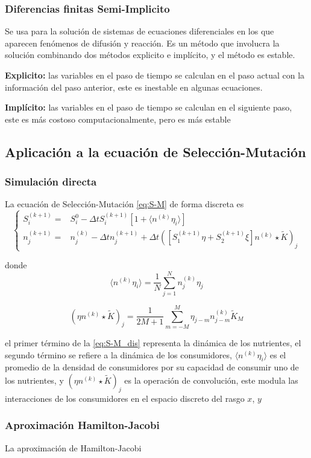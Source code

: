 \subsubsection{Diferencias finitas Semi-Implicito}

Se usa para la solución de sistemas de ecuaciones diferenciales en los que aparecen fenómenos de difusión y reacción. Es un método que involucra la solución combinando dos métodos explicito e implícito, y el método es estable.

\textbf{Explicito:} las variables en el paso de tiempo se calculan en el paso actual con la información del paso anterior, este es inestable en algunas ecuaciones.

\textbf{Implícito:} las variables en el paso de tiempo se calculan en el siguiente paso, este es más costoso computacionalmente, pero es más estable

\subsection{Aplicación a la ecuación de Selección-Mutación}
\subsubsection{Simulación directa}

La ecuación de Selección-Mutación \eqref{eq:S-M} de forma discreta es
\begin{equation}
	\left\{\begin{matrix}
		S_{i}^{(k+1)} = & S_{i}^{0}-\Delta tS_{i}^{(k+1)}[1+\langle{n^{(k)}\eta_{i}}\rangle  ]                                        \\
		n_{j}^{(k+1)} = & n_{j}^{(k)}-\Delta t n_{j}^{(k+1)}+\Delta t([S_{1}^{(k+1)}\eta+S_{2}^{(k+1)}\xi]n^{(k)}\star \tilde{K})_{j}
	\end{matrix}\right.
	\label{eq:S-M_dis}
\end{equation}

donde
\begin{equation*}
	\langle{n^{(k)}\eta_{i}}\rangle = \frac{1}{N}\sum_{j=1}^{N}n_{j}^{(k)}\eta_{j}
\end{equation*}

\begin{equation*}
	(\eta n^{(k)}\star \tilde{K})_{j}=\frac{1}{2M+1}\sum_{m=-M}^{M}\eta_{j-m}n_{j-m}^{(k)}\tilde{K}_{M}
\end{equation*}

el primer término de la \eqref{eq:S-M_dis} representa la dinámica de los nutrientes, el segundo término se refiere a la dinámica de los consumidores, $\langle{n^{(k)}\eta_{i}}\rangle$ es el promedio de la densidad de consumidores por su capacidad de consumir uno de los nutrientes, y $(\eta n^{(k)}\star \tilde{K})_{j}$ es la operación de convolución, este modula las interacciones de los consumidores en el espacio discreto del rasgo $x$, $y$

\subsubsection{Aproximación Hamilton-Jacobi}

La aproximación de Hamilton-Jacobi 


